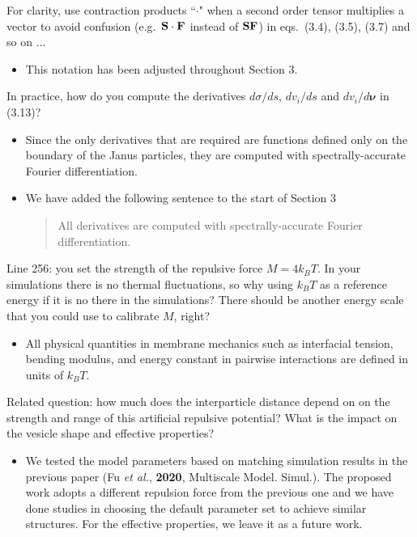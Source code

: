 \documentclass[11pt]{article}
\newcommand{\comment}[1]{{\color{blue} #1}}
\begin{document}
\noindent
\comment{For clarity, use contraction products ``$\cdot$" when a second
order tensor multiplies a vector to avoid confusion (e.g.~${\bf S} \cdot
{\bf F}$ instead of ${\bf SF}$) in eqs.~(3.4), (3.5), (3.7) and so on
$\ldots$}
\begin{itemize}
  \item This notation has been adjusted throughout Section 3.
\end{itemize}

\noindent
\comment{In practice, how do you compute the derivatives $d\sigma /ds$,
$dv_i/ds$ and $dv_i/d\boldsymbol{\nu}$ in (3.13)?}
\begin{itemize}
  \item Since the only derivatives that are required are functions
    defined only on the boundary of the Janus particles, they are
    computed with spectrally-accurate Fourier differentiation.

  \item We have added the following sentence to the start of Section 3
    \begin{quotation}
      All derivatives are computed with spectrally-accurate Fourier
      differentiation.
    \end{quotation}
\end{itemize}

\noindent
\comment{Line 256: you set the strength of the repulsive force $M = 4k_B
T$. In your simulations there is no thermal fluctuations, so why using
$k_B T$ as a reference energy if it is no there in the simulations?
There should be another energy scale that you could use to calibrate
$M$, right?}
\begin{itemize}
  \item All physical quantities in membrane mechanics such as interfacial tension, bending  modulus, and energy constant in pairwise interactions are defined in units of $k_BT$. 
\end{itemize}

\noindent
\comment{Related question: how much does the interparticle distance
depend on on the strength and range of this artificial repulsive
potential? What is the impact on the vesicle shape and effective
properties?}
\begin{itemize}
  \item We tested the model parameters based on matching simulation results in the previous paper  (Fu {\sl et al.}, {\bf 2020}, Multiscale Model. Simul.). The proposed work adopts a different repulsion force from the previous one and we have done studies in choosing the default parameter set to achieve similar structures. For the effective properties, we leave it as a future work.
\end{itemize}
\end{document}
